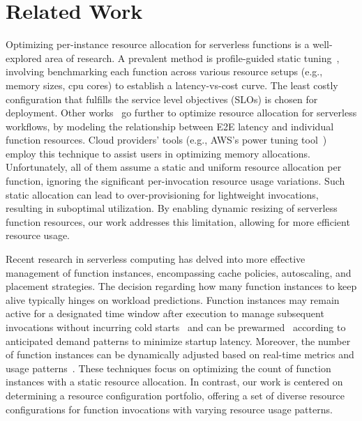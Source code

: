 \section{Related Work}
\label{sec:related}

Optimizing per-instance resource allocation for serverless functions is a
well-explored area of research. A prevalent method is profile-guided static
tuning~\cite{wang2018peeking, shahrad2020serverless},
involving benchmarking each function across various resource setups
(e.g., memory sizes, cpu cores) to establish a latency-vs-cost curve. The least costly
configuration that fulfills the service level objectives (SLOs) is chosen
for deployment.
Other works~\cite{pu2019shuffling, JinZXZHLJ23, zhang2024jolteon, ZhangTKCS21, ORION_MahgoubYSECB22,AQUATOPE_ZhouZD23}
go further to optimize resource allocation for serverless workflows,
by modeling the relationship between E2E latency and individual function resources.
Cloud providers’ tools (e.g., AWS’s power tuning tool~\cite{aws_lambda_power_tuning})
employ this technique to assist users in optimizing memory allocations.
Unfortunately, all of them assume a static and uniform resource allocation per function,
ignoring the significant per-invocation resource usage variations.
Such static allocation can lead to over-provisioning for lightweight invocations,
resulting in suboptimal utilization.
By enabling dynamic resizing of serverless function resources, our work
addresses this limitation, allowing for more efficient resource usage.


Recent research in serverless computing has delved into more effective management of function instances,
encompassing cache policies, autoscaling, and placement strategies.
The decision regarding how many function instances to keep alive typically hinges on workload predictions.
Function instances may remain active for a designated time window after execution to manage subsequent invocations
without incurring cold starts~\cite{ASPLOS21:FaaSCache} and can be prewarmed~\cite{ORION_MahgoubYSECB22}
according to anticipated demand patterns to minimize startup latency.
Moreover, the number of function instances can be dynamically adjusted based on real-time metrics and usage patterns~\cite{ORION_MahgoubYSECB22, aws_scaling_window, aws_scaling_eq, knative_scaling, AQUATOPE_ZhouZD23}.
These techniques focus on optimizing the count of function instances with a static resource allocation.
In contrast, our work is centered on determining a resource configuration portfolio,
offering a set of diverse resource configurations for function invocations
with varying resource usage patterns.

